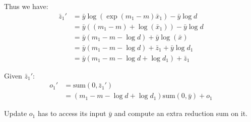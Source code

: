 Thus we have:
\begin{align*}
\bar{z}_1'&=\bar{y}\log\left(\exp(m_1-m)\bar{x}_1\right) - \bar{y}\log{d} \\
&=\bar{y}\left((m_1-m)+\log(\bar{x}_1)\right) -\bar{y}\log d \\
&=\bar{y}(m_1-m-\log d)+\bar{y}\log(\bar{x}) \\
&=\bar{y}(m_1-m-\log d)+\bar{z}_1+\bar{y}\log d_1 \\
&= \bar{y}(m_1-m-\log d+\log d_1)+\bar{z}_1
\end{align*}

Given $\bar{z}_1'$:
\begin{align*}
    o_1'&=\text{sum}(0, \bar{z}_1') \\
    &=(m_1-m-\log d+\log d_1)\text{sum}(0, \bar{y}) + o_1
\end{align*}

Update $o_1$ has to access its input $\bar{y}$ and compute an extra reduction sum on it.
